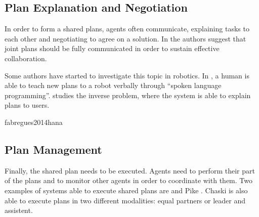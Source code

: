 \subsection{Plan Explanation and Negotiation}
In order to form a shared plans, agents often communicate, explaining tasks to each other and negotiating to agree on a solution. In \cite{Lallee2013} the authors suggest that joint plans should be fully communicated in order to sustain effective collaboration. 

Some authors have started to investigate this topic in robotics. In \cite{Petit2012}, a human is able to teach new plans to a robot verbally through ``spoken language programming''. \cite{Sorce2015} studies the inverse problem, where the system is able to explain plans to users. 

fabregues2014hana

\subsection{Plan Management}
Finally, the shared plan needs to be executed. Agents need to perform their part of the plans and to monitor other agents in order to coordinate with them. Two examples of systems able to execute shared plans are  \cite{shah2011improved} and Pike \cite{karpas2015robust}. Chaski is also able to execute plans in two different modalities: equal partners or leader and assistent.

